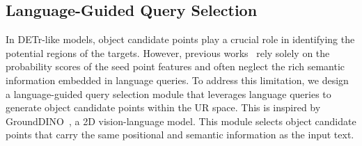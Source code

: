 \documentclass[lettersize,journal]{IEEEtran}
\begin{document}

\subsection{Language-Guided Query Selection}
\label{sec34}
In DETr-like models, object candidate points play a crucial role in identifying the potential regions of the targets. 
However, previous works~\cite{eda, vpp} rely solely on the probability scores of the seed point features and often neglect the rich semantic information embedded in language queries.
To address this limitation, we design a language-guided query selection module that leverages language queries to generate object candidate points within the UR space. This is inspired by GroundDINO~\cite{groundinginfo}, a 2D vision-language model.
This module selects object candidate points that carry the same positional and semantic information as the input text.
\end{document}
